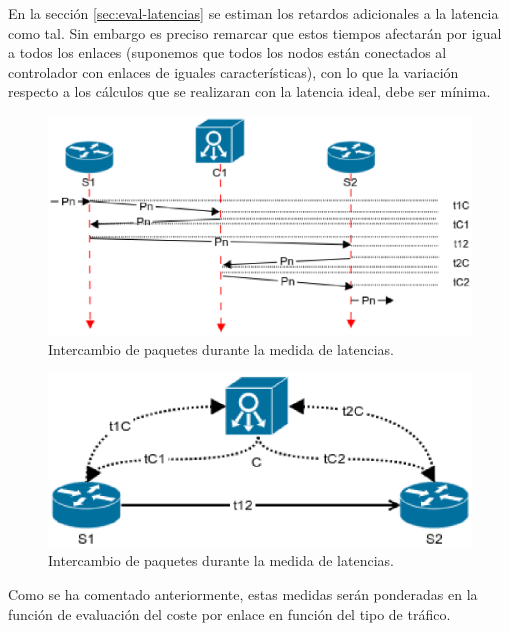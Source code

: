 \documentclass[a4paper,11pt]{book}
\begin{document}
En la sección \ref{sec:eval-latencias} se estiman los retardos adicionales a la latencia como tal. Sin embargo es preciso remarcar que estos tiempos afectarán por igual a todos los enlaces (suponemos que todos los nodos están conectados al controlador con enlaces de iguales características), con lo que la variación respecto a los cálculos que se realizaran con la latencia ideal, debe ser mínima. 

\begin{figure}[tb]
\centering
\hspace*{-1cm}
\includegraphics[scale=1]{./figuras/medirPaquete}
\caption[Exposición de tiempos para la medida de latencias.]{Intercambio de paquetes durante la medida de latencias.}\label{medirPaquete}
\end{figure}

\begin{figure}[tb]
\centering
\includegraphics[scale=0.8]{./figuras/medirPaquete2}
\caption[Exposición de tiempos para la medida de latencias.]{Intercambio de paquetes durante la medida de latencias.}\label{medirPaquete2}
\end{figure}

Como se ha comentado anteriormente, estas medidas serán ponderadas en la función de evaluación del coste por enlace en función del tipo de tráfico.
\end{document}
